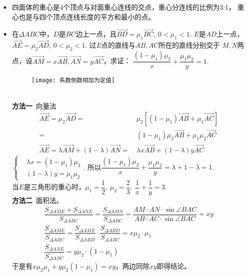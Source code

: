 \begin{itemize}[leftmargin=\inteval{\myitemleftmargin}pt,itemsep=
   \inteval{\myitemitempsep}pt,topsep=\inteval{\myitemtopsep}pt]
\item 四面体的重心是4个顶点与对面重心连线的交点，重心分连线的比例为3:1，
重心也是与四个顶点连线长度的平方和最小的点。

\item 在$ \Delta ABC $中，$ D $是$ BC $边上一点，且$ \vec{BD}=\mu_1
\vec{BC},\ 0<\mu_1<1 $. $ E $是$ AD $上一点，$ \vec{AE} =
\mu_2\vec{AD},\ 0<\mu_2<1 $. 过$ E $点的直线与$ AB,AC $所在的直线分别交于
$ M,N $两点，设$ \vec{AM}=x\vec{AB},\vec{AN}=
y\vec{AC} $，求证：
$ \dfrac{(1-\mu_1)\mu_2}{x}+\dfrac{\mu_1\mu_2}{y}=1 $. 
\begin{figure}[h]
    \centering
    \texttt{[image: 系数倒数相加为定值]}
\end{figure} \\
\textbf{方法一}\ 向量法
\begin{align*}
    \vec{AE} =\mu_2\vec{AD} =&\ \mu_2\left[
    (1-\mu_1)\vec{AB}+\mu_1\vec{AC}\right]\\
    =&\ (1-\mu_1)\mu_2\vec{AB}+\mu_1\mu_2\vec{AC} \\
    \vec{AE}=\lambda\vec{AM}+(1-\lambda)
    \vec{AN}=&\ \lambda x\vec{AB}+(1-\lambda)y
    \vec{AC}
\end{align*}
$ \left\{ 
\begin{aligned}
    &\lambda x = (1-\mu_1)\mu_2 \\
    &(1-\lambda)y = \mu_1\mu_2
\end{aligned} \right. $. 所以$ \dfrac{(1-\mu_1)\mu_2}{x}+\dfrac{\mu_1\mu_2}{y}
=\lambda+1-\lambda=1 $. \\
当$ E $是三角形的重心时，$ \mu_1=\dfrac{1}{2},\ \mu_2=\dfrac{2}{3},\ 
\dfrac{1}{x}+\dfrac{1}{y}=3 $. \\
\textbf{方法二}\ 面积法。
\begin{gather*}
    \dfrac{S_{\Delta AME}+S_{\Delta ANE}}{S_{\Delta ABC}}=
    \dfrac{S_{\Delta AMN}}{S_{\Delta ABC}}=\dfrac{AM\cdot AN\cdot\sin\angle BAC}
    {AB\cdot AC\cdot\sin\angle BAC}=xy \\
    \dfrac{S_{\Delta AME}}{S_{\Delta ABC}}=\dfrac{S_{\Delta AME}}
    {S_{\Delta ABD}}\cdot \dfrac{S_{\Delta ABD}}{S_{\Delta ABC}}=x\mu_2\cdot\mu_1 \\
    \dfrac{S_{\Delta ANE}}{S_{\Delta ABC}}=y\mu_2\cdot(1-\mu_1)
\end{gather*}
于是有$ x\mu_2\mu_1+y\mu_2(1-\mu_1)=xy $，两边同除$ xy $即得结论。


\end{itemize}
